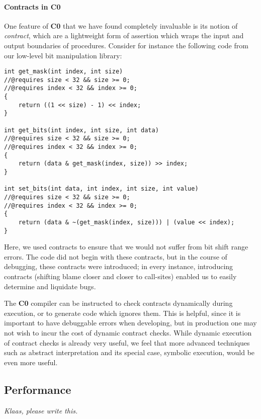 \documentclass{article}
\newcommand\Kwd[1]{{\sffamily\bfseries{#1}}}
\begin{document}
\paragraph{Contracts in \Kwd{C0}}

One feature of \Kwd{C0} that we have found completely invaluable is
its notion of \emph{contract}, which are a lightweight form of
assertion which wraps the input and output boundaries of
procedures. Consider for instance the following code from our
low-level bit manipulation library:

\begin{lstlisting}
int get_mask(int index, int size)
//@requires size < 32 && size >= 0;
//@requires index < 32 && index >= 0;
{
    return ((1 << size) - 1) << index;
}

int get_bits(int index, int size, int data)
//@requires size < 32 && size >= 0;
//@requires index < 32 && index >= 0;
{
    return (data & get_mask(index, size)) >> index;
}

int set_bits(int data, int index, int size, int value)
//@requires size < 32 && size >= 0;
//@requires index < 32 && index >= 0;
{
    return (data & ~(get_mask(index, size))) | (value << index);
}
\end{lstlisting}

Here, we used contracts to ensure that we would not suffer from bit
shift range errors. The code did not begin with these contracts, but
in the course of debugging, these contracts were introduced; in every
instance, introducing contracts (shifting blame closer and closer to
call-sites) enabled us to easily determine and liquidate bugs.

The \Kwd{C0} compiler can be instructed to check contracts dynamically
during execution, or to generate code which ignores them. This is
helpful, since it is important to have debuggable errors when
developing, but in production one may not wish to incur the cost of
dynamic contract checks. While dynamic execution of contract checks
is already very useful, we feel that more advanced techniques such as
abstract interpretation and its special case, symbolic execution,
would be even more useful.

\subsection{Performance}\label{sec:performance}

\textit{Klaas, please write this.}

\end{document}
